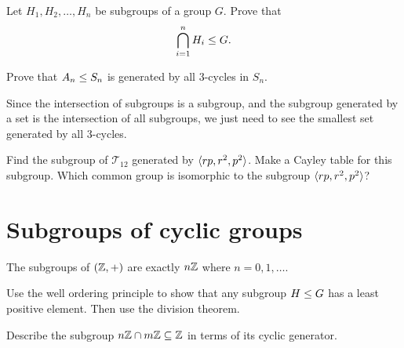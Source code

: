 \documentclass{ximera}
\begin{document}
\begin{exercise}
  Let $H_1,H_2,\dots,H_n$ be subgroups of a group $G$. Prove that
  \[
  \bigcap_{i=1}^n H_i \leq G.
  \]
\end{exercise}





\begin{exercise}
  Prove that $A_n\leq S_n$ is generated by all $3$-cycles in $S_n$.
  \begin{hint}
    Since the intersection of subgroups is a subgroup, and the
    subgroup generated by a set is the intersection of all subgroups,
    we just need to see the smallest set generated by all $3$-cycles. 
  \end{hint}
\end{exercise}

\begin{exercise}
  Find the subgroup of $\mathcal{T}_12$ generated by $\langle rp,
  r^2,p^2\rangle$. Make a Cayley table for this subgroup. Which common
  group is isomorphic to the subgroup $\langle rp, r^2,p^2\rangle$?
\end{exercise}





\section{Subgroups of cyclic groups}

\begin{theorem}
  The subgroups of $(\mathbb Z,+)$ are exactly $n\mathbb Z$ where $n = 0,1,\dots$.
  \begin{sketch}
    Use the well ordering principle to show that any subgroup $H\leq
    G$ has a least positive element. Then use the division theorem.
  \end{sketch}
\end{theorem}

\begin{exercise}
  Describe the subgroup $n\mathbb Z\cap m\mathbb Z \subseteq \mathbb Z$ in terms of its
  cyclic generator.
\end{exercise}
\end{document}
